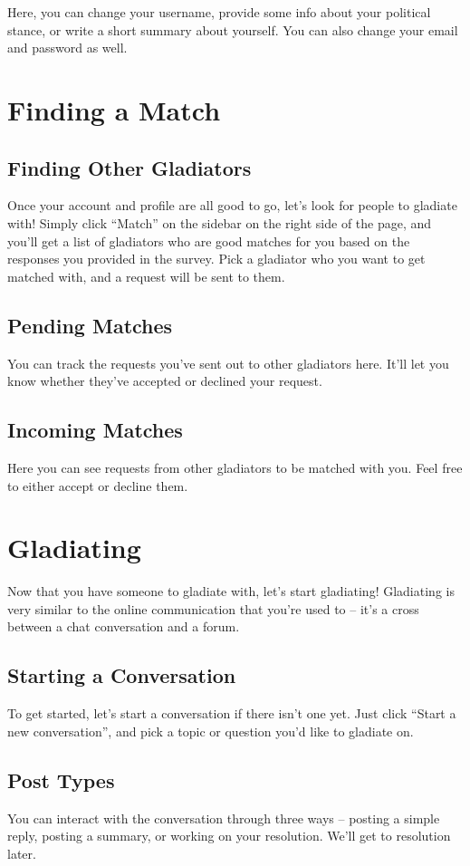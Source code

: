 \documentclass[12pt]{article}
\begin{document}
Here, you can change your username, provide some info about your political
stance, or write a short summary about yourself. You can also change your email
and password as well.

\section{Finding a Match}

\subsection{Finding Other Gladiators}
Once your account and profile are all good to go, let's look for people to
gladiate with! Simply click “Match” on the sidebar on the right side of the
page, and you'll get a list of gladiators who are good matches for you based on
the responses you provided in the survey. Pick a gladiator who you want to get
matched with, and a request will be sent to them.

\subsection{Pending Matches}
You can track the requests you've sent out to other gladiators here. It'll let
you know whether they've accepted or declined your request.

\subsection{Incoming Matches}
Here you can see requests from other gladiators to be matched with you. Feel
free to either accept or decline them.

\section{Gladiating}
Now that you have someone to gladiate with, let's start gladiating! Gladiating
is very similar to the online communication that you're used to – it's a cross
between a chat conversation and a forum.

\subsection{Starting a Conversation}
To get started, let's start a conversation if there isn't one yet. Just click
“Start a new conversation”, and pick a topic or question you'd like to gladiate
on.

\subsection{Post Types}
You can interact with the conversation through three ways – posting a simple
reply, posting a summary, or working on your resolution. We'll get to resolution
later.
\end{document}
